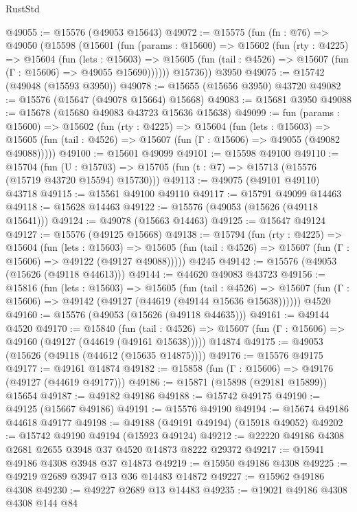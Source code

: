 \begin{lexlean}{RustStd}
\begin{coremodule}
@49055 := @15576 (@49053 @15643)
@49072 := @15575
    (fun (fn : @76) =>
    @49050
      (@15598
        (@15601
          (fun (params : @15600) =>
          @15602
            (fun (rty : @4225) =>
            @15604
              (fun (lets : @15603) =>
              @15605 (fun (tail : @4526) => @15607 (fun (Γ : @15606) => @49055 @15690))))))
        @15736))
    @3950
@49075 := @15742 (@49048 (@15593 @3950))
@49078 := @15655 (@15656 @3950) @43720
@49082 := @15576 (@15647 (@49078 @15664) @15668)
@49083 := @15681 @3950
@49088 := @15678 (@15680 @49083 @43723 @15636 @15638)
@49099 := fun (params : @15600) =>
  @15602
    (fun (rty : @4225) =>
    @15604
      (fun (lets : @15603) =>
      @15605 (fun (tail : @4526) => @15607 (fun (Γ : @15606) => @49055 (@49082 @49088)))))
@49100 := @15601 @49099
@49101 := @15598 @49100
@49110 := @15704
    (fun (U : @15703) => @15705 (fun (t : @7) => @15713 (@15576 (@15719 @43720 @15594) @15730)))
@49113 := @49075 (@49101 @49110) @43718
@49115 := @15561 @49100 @49110
@49117 := @15791 @49099 @14463
@49118 := @15628 @14463
@49122 := @15576 (@49053 (@15626 (@49118 @15641)))
@49124 := @49078 (@15663 @14463)
@49125 := @15647 @49124
@49127 := @15576 (@49125 @15668)
@49138 := @15794
    (fun (rty : @4225) =>
    @15604
      (fun (lets : @15603) =>
      @15605 (fun (tail : @4526) => @15607 (fun (Γ : @15606) => @49122 (@49127 @49088)))))
    @4245
@49142 := @15576 (@49053 (@15626 (@49118 @44613)))
@49144 := @44620 @49083 @43723
@49156 := @15816
    (fun (lets : @15603) =>
    @15605
      (fun (tail : @4526) =>
      @15607 (fun (Γ : @15606) => @49142 (@49127 (@44619 (@49144 @15636 @15638))))))
    @4520
@49160 := @15576 (@49053 (@15626 (@49118 @44635)))
@49161 := @49144 @4520
@49170 := @15840
    (fun (tail : @4526) => @15607 (fun (Γ : @15606) => @49160 (@49127 (@44619 (@49161 @15638)))))
    @14874
@49175 := @49053 (@15626 (@49118 (@44612 (@15635 @14875))))
@49176 := @15576 @49175
@49177 := @49161 @14874
@49182 := @15858 (fun (Γ : @15606) => @49176 (@49127 (@44619 @49177)))
@49186 := @15871 (@15898 (@29181 @15899)) @15654
@49187 := @49182 @49186
@49188 := @15742 @49175
@49190 := @49125 (@15667 @49186)
@49191 := @15576 @49190
@49194 := @15674 @49186 @44618 @49177
@49198 := @49188 (@49191 @49194) (@15918 @49052)
@49202 := @15742 @49190 @49194 (@15923 @49124)
@49212 := @22220 @49186 @4308 @2681 @2655 @3948 @37 @4520 @14873 @8222 @29372
@49217 := @15941 @49186 @4308 @3948 @37 @14873
@49219 := @15950 @49186 @4308
@49225 := @49219 @2689 @3947 @13 @36 @14483 @14872
@49227 := @15962 @49186 @4308
@49230 := @49227 @2689 @13 @14483
@49235 := @19021 @49186 @4308 @4308 @144 @84

\end{coremodule}
\end{lexlean}
